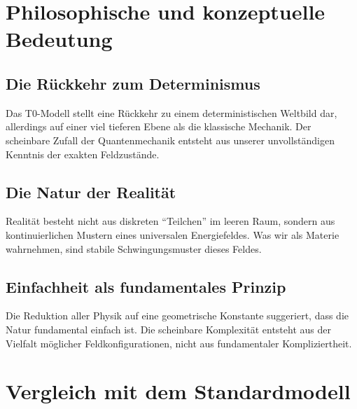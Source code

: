 \documentclass[12pt,a4paper]{article}
\begin{document}
	\section{Philosophische und konzeptuelle Bedeutung}
	
	\subsection{Die Rückkehr zum Determinismus}
	
	Das T0-Modell stellt eine Rückkehr zu einem deterministischen Weltbild dar, allerdings auf einer viel tieferen Ebene als die klassische Mechanik. Der scheinbare Zufall der Quantenmechanik entsteht aus unserer unvollständigen Kenntnis der exakten Feldzustände.
	
	\subsection{Die Natur der Realität}
	
	\begin{important}
		Realität besteht nicht aus diskreten ``Teilchen'' im leeren Raum, sondern aus kontinuierlichen Mustern eines universalen Energiefeldes. Was wir als Materie wahrnehmen, sind stabile Schwingungsmuster dieses Feldes.
	\end{important}
	
	\subsection{Einfachheit als fundamentales Prinzip}
	
	Die Reduktion aller Physik auf eine geometrische Konstante suggeriert, dass die Natur fundamental einfach ist. Die scheinbare Komplexität entsteht aus der Vielfalt möglicher Feldkonfigurationen, nicht aus fundamentaler Kompliziertheit.
	
	\section{Vergleich mit dem Standardmodell}
	
\end{document}
